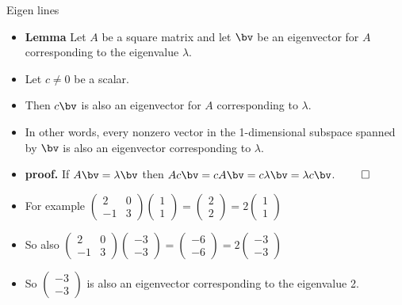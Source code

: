 \documentclass{beamer}
\begin{document}
\begin{frame}{Eigen lines}

\begin{itemize}
\item \textbf{Lemma} Let $A$ be a square matrix and let $\bv$ be an eigenvector for $A$ corresponding to the eigenvalue $\lambda$.
\item Let $c\not=0$ be a scalar.
\item Then $c\bv$ is also an eigenvector for $A$ corresponding to $\lambda$.
\item In other words, every nonzero vector in the 1-dimensional subspace spanned by $\bv$ is also an eigenvector corresponding to $\lambda$.
\item \textbf{proof.} If $A\bv=\lambda\bv$ then $Ac\bv=cA\bv=c\lambda\bv=\lambda c\bv$. $\qed$
\item For example
$
\begin{pmatrix}
2 & 0 \\
-1 & 3
\end{pmatrix}
\begin{pmatrix}
1 \\
1
\end{pmatrix}
=
\begin{pmatrix}
2 \\
2
\end{pmatrix}
= 2
\begin{pmatrix}
1 \\
1
\end{pmatrix}
$
\item So also
$
\begin{pmatrix}
2 & 0 \\
-1 & 3
\end{pmatrix}
\begin{pmatrix}
-3 \\
-3
\end{pmatrix}
=
\begin{pmatrix}
-6 \\
-6
\end{pmatrix}
= 2
\begin{pmatrix}
-3 \\
-3
\end{pmatrix}
$
\item So
$
\begin{pmatrix}
-3 \\
-3
\end{pmatrix}
$
is also an eigenvector corresponding to the eigenvalue 2.
\end{itemize}
\end{frame}
\end{document}
